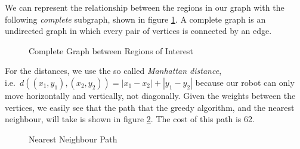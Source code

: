 We can represent the relationship between the regions in our graph with the following \textit{complete} subgraph, shown in figure \ref{fig:completeGraph}. A complete graph is an undirected graph in which every pair of vertices is connected by an edge. 
\begin{figure}
\centering
{}
\caption{Complete Graph between Regions of Interest}
\label{fig:completeGraph}
\end{figure}

For the distances, we use the so called \textit{Manhattan distance},\\ i.e.\ $d((x_1,y_1),(x_2,y_2)) = |x_1 - x_2| +| y_1 - y_2|$ because our robot can only move horizontally and vertically, not diagonally. Given the weights between the vertices, we easily see that the path that the greedy algorithm, and the nearest neighbour, will take is shown in figure \ref{fig:pathOnComplete}. The cost of this path is 62.

\begin{figure}
\centering
{}
\caption{Nearest Neighbour Path}
\label{fig:pathOnComplete}
\end{figure}

